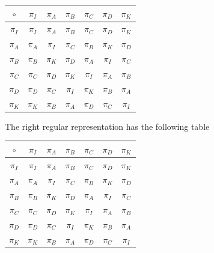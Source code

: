 \documentclass[twoside]{amsart}
\begin{document}
\begin{enumerate}[A.]
\begin{enumerate}[1]
      \begin{center}
      \begin{tabular}{c|cccccc}
         $\circ$ & $\pi_I$ & $\pi_A$ & $\pi_B$ & $\pi_C$ & $\pi_D$ & $\pi_K$\\
            \hline
         $\pi_I$ & $\pi_I$ & $\pi_A$ & $\pi_B$ & $\pi_C$ & $\pi_D$ & $\pi_K$\\
         $\pi_A$ & $\pi_A$ & $\pi_I$ & $\pi_C$ & $\pi_B$ & $\pi_K$ & $\pi_D$\\
         $\pi_B$ & $\pi_B$ & $\pi_K$ & $\pi_D$ & $\pi_A$ & $\pi_I$ & $\pi_C$\\
         $\pi_C$ & $\pi_C$ & $\pi_D$ & $\pi_K$ & $\pi_I$ & $\pi_A$ & $\pi_B$\\
         $\pi_D$ & $\pi_D$ & $\pi_C$ & $\pi_I$ & $\pi_K$ & $\pi_B$ & $\pi_A$\\
         $\pi_K$ & $\pi_K$ & $\pi_B$ & $\pi_A$ & $\pi_D$ & $\pi_C$ & $\pi_I$\\
      \end{tabular}
      \end{center}

      The right regular representation has the following table

      \begin{center}
      \begin{tabular}{c|cccccc}
         $\circ$ & $\pi_I$ & $\pi_A$ & $\pi_B$ & $\pi_C$ & $\pi_D$ & $\pi_K$\\
            \hline
         $\pi_I$ & $\pi_I$ & $\pi_A$ & $\pi_B$ & $\pi_C$ & $\pi_D$ & $\pi_K$\\
         $\pi_A$ & $\pi_A$ & $\pi_I$ & $\pi_C$ & $\pi_B$ & $\pi_K$ & $\pi_D$\\
         $\pi_B$ & $\pi_B$ & $\pi_K$ & $\pi_D$ & $\pi_A$ & $\pi_I$ & $\pi_C$\\
         $\pi_C$ & $\pi_C$ & $\pi_D$ & $\pi_K$ & $\pi_I$ & $\pi_A$ & $\pi_B$\\
         $\pi_D$ & $\pi_D$ & $\pi_C$ & $\pi_I$ & $\pi_K$ & $\pi_B$ & $\pi_A$\\
         $\pi_K$ & $\pi_K$ & $\pi_B$ & $\pi_A$ & $\pi_D$ & $\pi_C$ & $\pi_I$\\
      \end{tabular}
      \end{center}
      

   \end{enumerate}

\end{enumerate}
\end{document}
